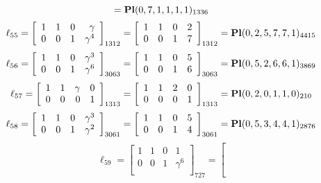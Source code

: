 \documentclass{article}
\begin{document}
{$$={\rm\bf Pl}(0,7,1,1,1,1 )_{1336}$$
$$
\ell_{55} = 
\left[
\begin{array}{*{4}{r}}
1 & 1 & 0 & \gamma \\
0 & 0 & 1 & \gamma^{4}\\
\end{array}
\right]
_{1312}
=
\left[
\begin{array}{*{4}c}
1  & 1  & 0  & 2\\
0  & 0  & 1  & 7\\
\end{array}
\right]_{1312}
={\rm\bf Pl}(0,2,5,7,7,1 )_{4415}$$
$$
\ell_{56} = 
\left[
\begin{array}{*{4}{r}}
1 & 1 & 0 & \gamma^{3}\\
0 & 0 & 1 & \gamma^{6}\\
\end{array}
\right]
_{3063}
=
\left[
\begin{array}{*{4}c}
1  & 1  & 0  & 5\\
0  & 0  & 1  & 6\\
\end{array}
\right]_{3063}
={\rm\bf Pl}(0,5,2,6,6,1 )_{3869}$$
$$
\ell_{57} = 
\left[
\begin{array}{*{4}{r}}
1 & 1 & \gamma  & 0\\
0 & 0 & 0 & 1\\
\end{array}
\right]
_{1313}
=
\left[
\begin{array}{*{4}c}
1  & 1  & 2  & 0\\
0  & 0  & 0  & 1\\
\end{array}
\right]_{1313}
={\rm\bf Pl}(0,2,0,1,1,0 )_{210}$$
$$
\ell_{58} = 
\left[
\begin{array}{*{4}{r}}
1 & 1 & 0 & \gamma^{3}\\
0 & 0 & 1 & \gamma^{2}\\
\end{array}
\right]
_{3061}
=
\left[
\begin{array}{*{4}c}
1  & 1  & 0  & 5\\
0  & 0  & 1  & 4\\
\end{array}
\right]_{3061}
={\rm\bf Pl}(0,5,3,4,4,1 )_{2876}$$
$$
\ell_{59} = 
\left[
\begin{array}{*{4}{r}}
1 & 1 & 0 & 1\\
0 & 0 & 1 & \gamma^{6}\\
\end{array}
\right]
_{727}
=
\left[
$$}
\end{document}
